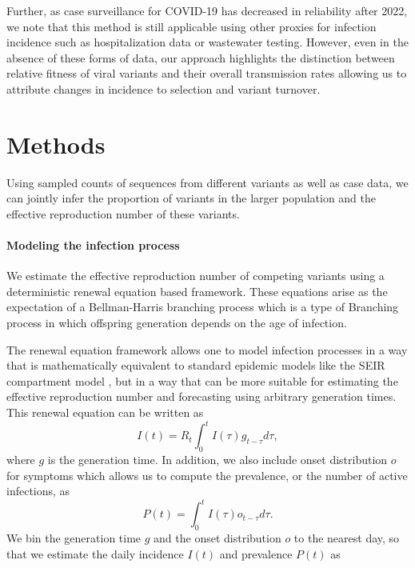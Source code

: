 Further, as case surveillance for COVID-19 has decreased in reliability after 2022, we note that this method is still applicable using other proxies for infection incidence such as hospitalization data or wastewater testing.
However, even in the absence of these forms of data, our approach highlights the distinction between relative fitness of viral variants and their overall transmission rates allowing us to attribute changes in incidence to selection and variant turnover.

\section{Methods}

Using sampled counts of sequences from different variants as well as case data, we can jointly infer the proportion of variants in the larger population and the effective reproduction number of these variants.

\paragraph{Modeling the infection process}%

We estimate the effective reproduction number of competing variants using a deterministic renewal equation based framework. These equations arise as the expectation of a Bellman-Harris branching process \cite{Bellman1948} which is a type of Branching process in which offspring generation depends on the age of infection.

The renewal equation framework allows one to model infection processes in a way that is mathematically equivalent to standard epidemic models like the SEIR compartment model \cite{Champredon2018}, but in a way that can be more suitable for estimating the effective reproduction number and forecasting using arbitrary generation times. This renewal equation can be written as
\begin{equation}
  I(t) = R_{t} \int_{0}^{t} I(\tau)g_{t-\tau} d\tau,
\end{equation}
where $g$ is the generation time.
In addition, we also include onset distribution $o$ for symptoms which allows us to compute the prevalence, or the number of active infections, as
\begin{equation}
  P(t) = \int_{0}^{t} I(\tau) o_{t-\tau} d \tau.
\end{equation}
We bin the generation time $g$ and the onset distribution $o$ to the nearest day, so that we estimate the daily incidence $I(t)$ and prevalence $P(t)$ as

